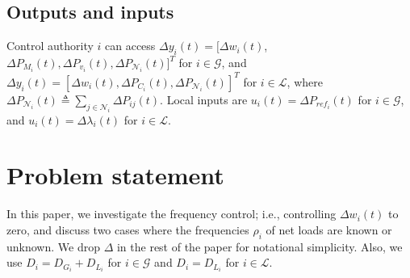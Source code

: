 \documentclass[journal]{IEEEtran}
\newcommand{\lbd}{{\lambda}}
\newcommand{\GG}{{\mathcal{G}}}
\newcommand{\LL}{{\mathcal{L}}}
\newcommand{\NN}{{\mathcal{N}}}
\begin{document}
\subsection{Outputs and inputs}\label{sec:outcon}
Control authority $i$ can access $\Delta y_i(t)=[\Delta w_i(t)$, $\Delta P_{M_i}(t),  \Delta P_{v_i}(t),\Delta P_{\NN_i}(t)]^T$ for $i \in {\GG}$, and $\Delta y_i(t)=[\Delta w_i(t), \Delta P_{C_i}(t),  \Delta P_{\NN_i}(t)]^T$ for $i \in {\LL}$, where $\Delta P_{\NN_i}(t) \triangleq \sum_{j \in {{\NN}}_i}\Delta P_{ij}(t)$. Local inputs are $u_i(t) = \Delta P_{ref_i}(t)$ for $i \in {\GG}$, and $u_i(t) = \Delta \lbd_i(t)$ for $i \in {\LL}$.

\section{Problem statement}\label{sec:controller}
In this paper, we investigate the frequency control; i.e., controlling $\Delta w_i(t)$ to zero, and discuss two cases where the frequencies $\rho_i$ of net loads are known or unknown.
We drop $\Delta$ in the rest of the paper for notational simplicity. Also, we use $D_i=D_{G_i}+D_{L_i}$ for $i \in \GG$ and $D_i=D_{L_i}$ for $i \in \LL$. 
\end{document}
